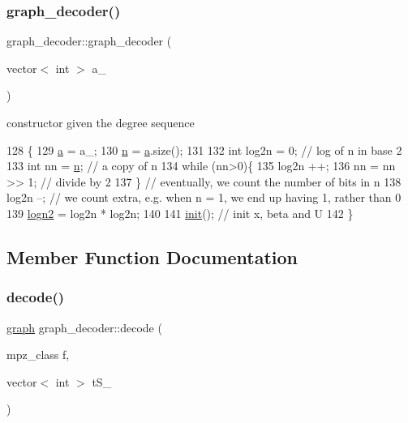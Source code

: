 \subsubsection{\texorpdfstring{graph\+\_\+decoder()}{graph\_decoder()}}
{\footnotesize\ttfamily graph\+\_\+decoder\+::graph\+\_\+decoder (\begin{DoxyParamCaption}\item[{vector$<$ int $>$}]{a\+\_\+ }\end{DoxyParamCaption})}



constructor given the degree sequence 


\begin{DoxyCode}
128 \{
129   \hyperlink{classgraph__decoder_a9dd7c3c11b8a45a12cb7c3c2d2bfa2cc}{a} = a\_;
130   \hyperlink{classgraph__decoder_a6bc1e72b2f7a913d14b789a6c2d92c1e}{n} = \hyperlink{classgraph__decoder_a9dd7c3c11b8a45a12cb7c3c2d2bfa2cc}{a}.size();
131 
132   \textcolor{keywordtype}{int} log2n = 0; \textcolor{comment}{// log of n in base 2}
133   \textcolor{keywordtype}{int} nn = \hyperlink{classgraph__decoder_a6bc1e72b2f7a913d14b789a6c2d92c1e}{n}; \textcolor{comment}{// a copy of n}
134   \textcolor{keywordflow}{while} (nn>0)\{
135     log2n ++;
136     nn = nn >> 1; \textcolor{comment}{// divide by 2}
137   \} \textcolor{comment}{// eventually, we count the number of bits in n}
138   log2n --; \textcolor{comment}{// we count extra, e.g. when n = 1, we end up having 1, rather than 0}
139   \hyperlink{classgraph__decoder_a59663482843ffa5059128bd6ed866f11}{logn2} = log2n * log2n;
140 
141   \hyperlink{classgraph__decoder_a97a9dcd5af21ece86fa91adcb41ca9cc}{init}(); \textcolor{comment}{// init x, beta and U}
142 \}
\end{DoxyCode}


\subsection{Member Function Documentation}
\mbox{\label{classgraph__decoder_a3d2ef81ec6ac66e50c1809f361143922}} 
\subsubsection{\texorpdfstring{decode()}{decode()}}
{\footnotesize\ttfamily \hyperlink{classgraph}{graph} graph\+\_\+decoder\+::decode (\begin{DoxyParamCaption}\item[{mpz\+\_\+class}]{f,  }\item[{vector$<$ int $>$}]{t\+S\+\_\+ }\end{DoxyParamCaption})}



